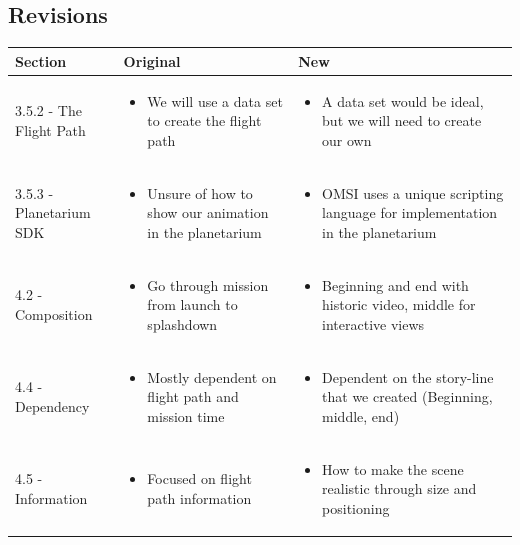 \documentclass[onecolumn, draftclsnofoot,10pt, compsoc]{IEEEtran}
\begin{document}
\newpage
{}
\subsection*{Revisions}
\begin{tabular} {|p{4cm}|p{5cm}|p{6cm}|}
\hline
Section & Original & New \\ \hline
3.5.2 - The Flight Path & \begin{itemize}
  \item We will use a data set to create the flight path
\end{itemize} & \begin{itemize}
  \item A data set would be ideal, but we will need to create our own
\end{itemize}\\ \hline
3.5.3 - Planetarium SDK & \begin{itemize}
  \item Unsure of how to show our animation in the planetarium
\end{itemize} & \begin{itemize}
  \item OMSI uses a unique scripting language for implementation in the planetarium
\end{itemize}\\ \hline
4.2 - Composition & \begin{itemize}
  \item Go through mission from launch to splashdown
\end{itemize} & \begin{itemize}
  \item Beginning and end with historic video, middle for interactive views
\end{itemize}\\ \hline
4.4 - Dependency & \begin{itemize}
  \item Mostly dependent on flight path and mission time
\end{itemize} & \begin{itemize}
  \item Dependent on the story-line that we created (Beginning, middle, end)
\end{itemize}\\ \hline
4.5 - Information & \begin{itemize}
  \item Focused on flight path information
\end{itemize} & \begin{itemize}
  \item How to make the scene realistic through size and positioning
\end{itemize}\\ \hline

\end{tabular}
\end{document}
